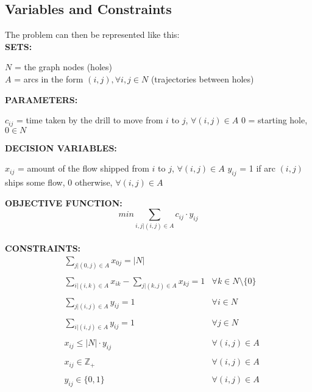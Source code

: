 	\subsection{Variables and Constraints}
		The problem can then be represented like this:\\
		\newline
		\textbf{SETS:}\\
		\begin{addmargin}[2em]{0em}
			$N$ = the graph nodes (holes)\\
			$A$ = arcs in the form $(i, j), ∀ i, j ∈ N$ (trajectories between holes)\\
		\end{addmargin}
		\textbf{PARAMETERS:}\\
		\begin{addmargin}[2em]{0em}
			$c_{ij}$ = time taken by the drill to move from $i$ to $j$, $∀ (i, j) ∈ A$
			$0$ = starting hole, $0 ∈ N$\\
		\end{addmargin}
		\textbf{DECISION VARIABLES:}\\
		\begin{addmargin}[2em]{0em}
			$x_{ij}$ = amount of the flow shipped from $i$ to $j$, $∀ (i, j) ∈ A$
			$y_{ij}$ = 1 if arc $(i, j)$ ships some flow, 0 otherwise, $∀ (i, j) ∈ A$\\
		\end{addmargin}
		\textbf{OBJECTIVE FUNCTION:}\\
		\[min \sum_{i, j | (i, j) ∈ A} c_{ij} \cdot y_{ij}\]\\
		\textbf{CONSTRAINTS:}
		\begin{align*}
			&\sum_{j | (0,j) ∈ A} x_{0j} = |N|\\
			\\
			&\sum_{i | (i, k) ∈ A} x_{ik} - \sum_{j | (k, j) ∈ A} x_{kj} = 1 & ∀ k ∈ N \setminus \{0\}\\
			\\
			&\sum_{j | (i, j) ∈ A} y_{ij} = 1 & ∀ i ∈ N\\
			\\
			&\sum_{i | (i, j) ∈ A} y_{ij} = 1 & ∀ j ∈ N\\
			\\
			&x_{ij} \leq |N| \cdot y_{ij} & ∀ (i, j) ∈ A\\
			\\
			&x_{ij} ∈ \mathbb{Z}_{+} & ∀ (i, j) ∈ A\\
			\\
			&y_{ij} ∈ \{0, 1\} & ∀ (i, j) ∈ A\\
		\end{align*}

		
		